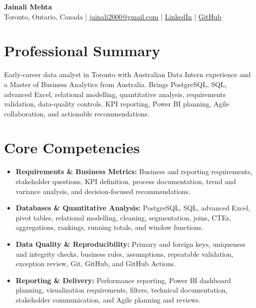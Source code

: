 \documentclass[letterpaper,10pt]{article}
\begin{document}
\begin{center}
  {\fontsize{17}{19}\selectfont\textbf{Jainali Mehta}}\\[2pt]
  \small Toronto, Ontario, Canada \;|\;
  \href{mailto:jainali2000@gmail.com}{jainali2000@gmail.com} \;|\;
  \href{https://www.linkedin.com/in/jainali-mehta}{LinkedIn} \;|\;
  \href{https://github.com/jainalimehta}{GitHub}
\end{center}
\vspace{-7pt}

\section{Professional Summary}
\small Early-career data analyst in Toronto with Australian Data Intern experience and a Master of Business Analytics from Australia. Brings PostgreSQL, SQL, advanced Excel, relational modelling, quantitative analysis, requirements validation, data-quality controls, KPI reporting, Power BI planning, Agile collaboration, and actionable recommendations.

\section{Core Competencies}
\begin{itemize}[leftmargin=0.16in,label=\textbullet,topsep=0pt,itemsep=1pt,parsep=0pt]
  \item \small \textbf{Requirements \& Business Metrics:} Business and reporting requirements, stakeholder questions, KPI definition, process documentation, trend and variance analysis, and decision-focused recommendations.
  \item \small \textbf{Databases \& Quantitative Analysis:} PostgreSQL, SQL, advanced Excel, pivot tables, relational modelling, cleaning, segmentation, joins, CTEs, aggregations, rankings, running totals, and window functions.
  \item \small \textbf{Data Quality \& Reproducibility:} Primary and foreign keys, uniqueness and integrity checks, business rules, assumptions, repeatable validation, exception review, Git, GitHub, and GitHub Actions.
  \item \small \textbf{Reporting \& Delivery:} Performance reporting, Power BI dashboard planning, visualization requirements, filters, technical documentation, stakeholder communication, and Agile planning and reviews.
\end{itemize}
\end{document}
